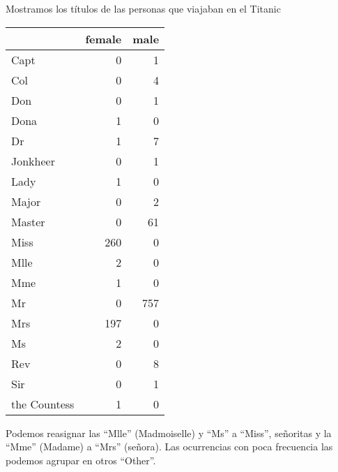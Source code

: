\documentclass[]{article}
\newenvironment{Shaded}{\begin{snugshade}}{\end{snugshade}}
\newcommand{\KeywordTok}[1]{\textcolor[rgb]{0.13,0.29,0.53}{\textbf{#1}}}
\newcommand{\DataTypeTok}[1]{\textcolor[rgb]{0.13,0.29,0.53}{#1}}
\newcommand{\StringTok}[1]{\textcolor[rgb]{0.31,0.60,0.02}{#1}}
\newcommand{\CommentTok}[1]{\textcolor[rgb]{0.56,0.35,0.01}{\textit{#1}}}
\newcommand{\OperatorTok}[1]{\textcolor[rgb]{0.81,0.36,0.00}{\textbf{#1}}}
\newcommand{\NormalTok}[1]{#1}
\begin{document}
Mostramos los títulos de las personas que viajaban en el Titanic

\begin{Shaded}
\end{Shaded}

\begin{tabular}{l|r|r}
\hline
  & female & male\\
\hline
Capt & 0 & 1\\
\hline
Col & 0 & 4\\
\hline
Don & 0 & 1\\
\hline
Dona & 1 & 0\\
\hline
Dr & 1 & 7\\
\hline
Jonkheer & 0 & 1\\
\hline
Lady & 1 & 0\\
\hline
Major & 0 & 2\\
\hline
Master & 0 & 61\\
\hline
Miss & 260 & 0\\
\hline
Mlle & 2 & 0\\
\hline
Mme & 1 & 0\\
\hline
Mr & 0 & 757\\
\hline
Mrs & 197 & 0\\
\hline
Ms & 2 & 0\\
\hline
Rev & 0 & 8\\
\hline
Sir & 0 & 1\\
\hline
the Countess & 1 & 0\\
\hline
\end{tabular}

Podemos reasignar las ``Mlle'' (Madmoiselle) y ``Ms'' a ``Miss'',
señoritas y la ``Mme'' (Madame) a ``Mrs'' (señora). Las ocurrencias con
poca frecuencia las podemos agrupar en otros ``Other''.
\end{document}
